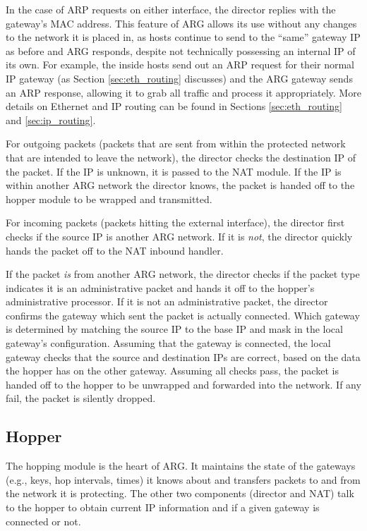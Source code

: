 \par In the case of \ac{ARP} requests on either interface, the director replies with the gateway's \ac{MAC} address. This feature of \ac{ARG} allows its use without any changes to the network it is placed in, as hosts continue to send to the ``same'' gateway IP as before and \ac{ARG} responds, despite not technically possessing an internal \ac{IP} of its own. For example, the inside hosts send out an \ac{ARP} request for their normal \ac{IP} gateway (as Section \ref{sec:eth_routing} discusses) and the \ac{ARG} gateway sends an \ac{ARP} response, allowing it to grab all traffic and process it appropriately. More details on Ethernet and \ac{IP} routing can be found in Sections \ref{sec:eth_routing} and \ref{sec:ip_routing}.

\par For outgoing packets (packets that are sent from within the protected network that are intended to leave the network), the director checks the destination \ac{IP} of the packet. If the IP is unknown, it is passed to the \ac{NAT} module. If the IP is within another \ac{ARG} network the director knows, the packet is handed off to the hopper module to be wrapped and transmitted.

\par For incoming packets (packets hitting the external interface), the director first checks if the source IP is another ARG network. If it is \textit{not}, the director quickly hands the packet off to the NAT inbound handler.

\par If the packet \textit{is} from another ARG network, the director checks if the packet type indicates it is an administrative packet and hands it off to the hopper's administrative processor. If it is not an administrative packet, the director confirms the gateway which sent the packet is actually connected. Which gateway is determined by matching the source \ac{IP} to the base \ac{IP} and mask in the local gateway's configuration. Assuming that the gateway is connected, the local gateway checks that the source and destination \acp{IP} are correct, based on the data the hopper has on the other gateway. Assuming all checks pass, the packet is handed off to the hopper to be unwrapped and forwarded into the network. If any fail, the packet is silently dropped.

\subsection{Hopper}
\label{sec:arg_hopper}
\par The hopping module is the heart of ARG. It maintains the state of the gateways (e.g., keys, hop intervals, times) it knows about and transfers packets to and from the network it is protecting. The other two components (director and \ac{NAT}) talk to the hopper to obtain current IP information and if a given gateway is connected or not. 

